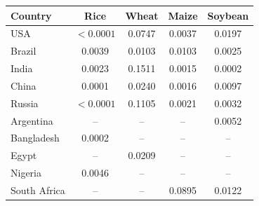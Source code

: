\begin{tabular}{lcccc}
\toprule
\textbf{Country} & \textbf{Rice} & \textbf{Wheat} & \textbf{Maize} & \textbf{Soybean} \\
\midrule
USA & $<0.0001$ & 0.0747 & 0.0037 & 0.0197 \\
Brazil & 0.0039 & 0.0103 & 0.0103 & 0.0025 \\
India & 0.0023 & 0.1511 & 0.0015 & 0.0002 \\
China & 0.0001 & 0.0240 & 0.0016 & 0.0097 \\
Russia & $<0.0001$ & 0.1105 & 0.0021 & 0.0032 \\
Argentina & -- & -- & -- & 0.0052 \\
Bangladesh & 0.0002 & -- & -- & -- \\
Egypt & -- & 0.0209 & -- & -- \\
Nigeria & 0.0046 & -- & -- & -- \\
South Africa & -- & -- & 0.0895 & 0.0122 \\
\bottomrule
\end{tabular}
